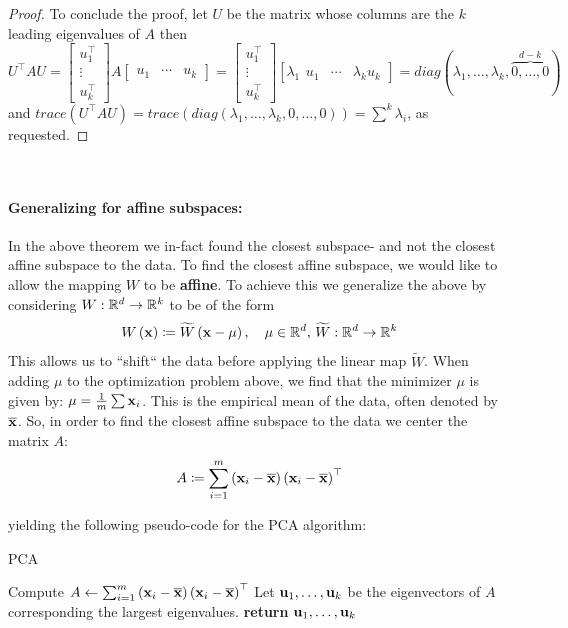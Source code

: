 \begin{proof}
To conclude the proof, let $U$ be the matrix whose columns are the $k$ leading eigenvalues of $A$ then $$
U^{\top}AU=\left[\begin{array}{c}
u_{1}^{\top}\\
\vdots\\
u_{k}^{\top}
\end{array}\right]A\left[\begin{array}{ccc}
u_{1} & \cdots & u_{k}\end{array}\right]=\left[\begin{array}{c}
u_{1}^{\top}\\
\vdots\\
u_{k}^{\top}
\end{array}\right]\left[\lambda_{1}\begin{array}{ccc}
u_{1} & \cdots & \lambda_{k}u_{k}\end{array}\right]=diag\left(\lambda_{1},\ldots,\lambda_{k},\overset{d-k}{\overbrace{0,\ldots,0}}\right)
$$
and $trace\left(U^\top A U\right) = trace\left(diag\left(\lambda_{1},\ldots,\lambda_{k},0,\ldots,0\right)\right)=\sum^k \lambda_i$, as requested.
\end{proof}


~\\\paragraph{Generalizing for affine subspaces:} In the above theorem we in-fact found the closest subspace- and not the closest affine subspace to the data. To find the closest affine subspace, we would like to allow the mapping $W$ to be \textbf{affine}. To achieve this we generalize the above by considering $W:\mathbb{R}^d\rightarrow\mathbb{R}^k$ to be of the form $$ W\left(\mathbf{x}\right)\coloneqq\widetilde{W}\left(\mathbf{x}-\mu\right),\quad \mu\in\mathbb{R}^d,\, \widetilde{W}:\mathbb{R}^d\rightarrow\mathbb{R}^k$$ 
This allows us to ``shift`` the data before applying the linear map $\widetilde{W}$. When adding $\mu$ to the optimization problem above, we find that the minimizer $\mu$ is given by: $ \mu = \frac{1}{m}\sum \mathbf{x}_i $. This is the empirical mean of the data, often denoted by $\overline{\mathbf{x}}$. So, in order to find the closest affine subspace to the data we center the matrix $A$: $$ A\coloneqq \sum_{i=1}^m \left(\mathbf{x}_i -\overline{\mathbf{x}}\right)\left(\mathbf{x}_i -\overline{\mathbf{x}}\right)^\top $$

yielding the following pseudo-code for the PCA algorithm:

\begin{algorithm}
	\caption{PCA}\label{pca_pseudo}
	\begin{algorithmic}
		\State Compute $A\gets \sum_{i=1}^m \left(\mathbf{x}_i-\overline{\mathbf{x}}\right)\left(\mathbf{x}_i-\overline{\mathbf{x}}\right)^\top$ 
		\State Let $\mathbf{u}_1,\ldots,\mathbf{u}_k$ be the eigenvectors of $A$ corresponding the largest eigenvalues.
		\State \textbf{return} $\mathbf{u}_1,\ldots,\mathbf{u}_k$
		\EndProcedure
	\end{algorithmic}
\end{algorithm}

